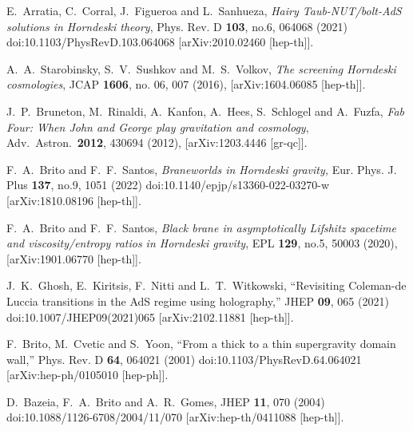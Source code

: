 \documentclass[aps,12pt, a4paper,nofootinbib]{revtex4}
\begin{document}
{\begin{thebibliography}{99}
E.~Arratia, C.~Corral, J.~Figueroa and L.~Sanhueza,
{\it Hairy Taub-NUT/bolt-AdS solutions in Horndeski theory},
Phys. Rev. D \textbf{103}, no.6, 064068 (2021)
doi:10.1103/PhysRevD.103.064068
[arXiv:2010.02460 [hep-th]].

  A.~A.~Starobinsky, S.~V.~Sushkov and M.~S.~Volkov,
  {\it The screening Horndeski cosmologies},
  JCAP {\bf 1606}, no. 06, 007 (2016),
  [arXiv:1604.06085 [hep-th]].
	
  J.~P.~Bruneton, M.~Rinaldi, A.~Kanfon, A.~Hees, S.~Schlogel and A.~Fuzfa,
  {\it Fab Four: When John and George play gravitation and cosmology},
  Adv.\ Astron.\  {\bf 2012}, 430694 (2012),
  [arXiv:1203.4446 [gr-qc]].
	
   
F.~A.~Brito and F.~F.~Santos,
{\it Braneworlds in Horndeski gravity,}
Eur. Phys. J. Plus \textbf{137}, no.9, 1051 (2022)
doi:10.1140/epjp/s13360-022-03270-w
[arXiv:1810.08196 [hep-th]].
	
F.~A.~Brito and F.~F.~Santos,
{\it Black brane in asymptotically Lifshitz spacetime and viscosity/entropy ratios in Horndeski gravity},
EPL \textbf{129}, no.5, 50003 (2020),
[arXiv:1901.06770 [hep-th]].
	

  
J.~K.~Ghosh, E.~Kiritsis, F.~Nitti and L.~T.~Witkowski,
``Revisiting Coleman-de Luccia transitions in the AdS regime using holography,''
JHEP \textbf{09}, 065 (2021)
doi:10.1007/JHEP09(2021)065
[arXiv:2102.11881 [hep-th]].
  
  
F.~Brito, M.~Cvetic and S.~Yoon,
``From a thick to a thin supergravity domain wall,''
Phys. Rev. D \textbf{64}, 064021 (2001)
doi:10.1103/PhysRevD.64.064021
[arXiv:hep-ph/0105010 [hep-ph]].


D.~Bazeia, F.~A.~Brito and A.~R.~Gomes,
JHEP \textbf{11}, 070 (2004)
doi:10.1088/1126-6708/2004/11/070
[arXiv:hep-th/0411088 [hep-th]].
	

\end{thebibliography}}
\end{document}
